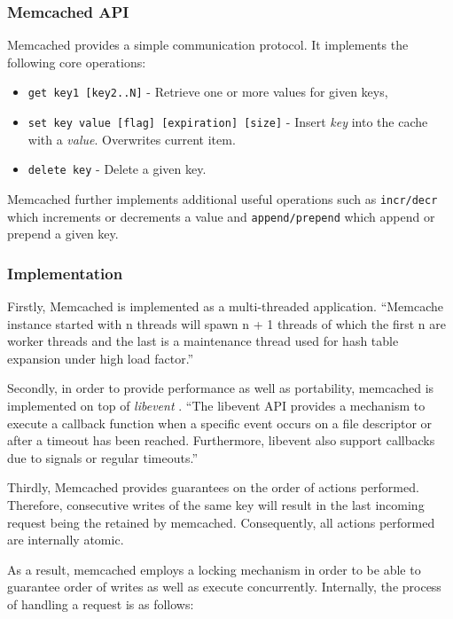 \subsubsection{Memcached API}
Memcached provides a simple communication protocol. It implements the following core operations:

\begin{itemize}
    \item \texttt{get key1 [key2..N]} - Retrieve one or more values for given keys,
    \item \texttt{set key value [flag] [expiration] [size]} - Insert \textit{key} into the cache with a \textit{value}. Overwrites current item.
    \item \texttt{delete key} - Delete a given key.
\end{itemize}

Memcached further implements additional useful operations such as \texttt{incr/decr} which increments or decrements a value and \texttt{append/prepend} which append or prepend a given key.

\subsubsection{Implementation}
Firstly, Memcached is implemented as a multi-threaded application. ``Memcache instance started with n threads will spawn n + 1 threads of which the first n are worker threads and the last
is a maintenance thread used for hash table expansion under high load factor.'' \cite{solarflarememcached}

Secondly, in order to provide performance as well as  portability, memcached is implemented on top of \textit{libevent} \cite{libevent}. ``The libevent API provides a mechanism to execute a callback function when a specific event occurs on a file descriptor or after a timeout has been reached. Furthermore, libevent also support callbacks due to signals or regular timeouts.'' \cite{libevent}

Thirdly, Memcached provides guarantees on the order of actions performed. Therefore, consecutive writes of the same key will result in the last incoming request being the retained by memcached. Consequently, all actions performed are internally atomic.

As a result, memcached employs a locking mechanism in order to be able to guarantee order of writes as well as execute concurrently. Internally, the process of handling a request is as follows:

